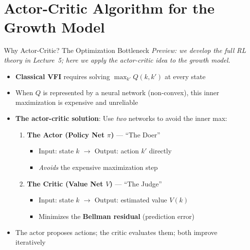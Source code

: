 \documentclass[10pt,english,aspectratio=169]{beamer}
\begin{document}
\section{Actor-Critic Algorithm for the Growth Model}

\begin{frame}{Why Actor-Critic? The Optimization Bottleneck}
\emph{Preview: we develop the full RL theory in Lecture~5; here we apply the actor-critic idea to the growth model.}
\medskip
\begin{itemize}
  \item \textbf{Classical VFI} requires solving $\max_{k'} Q(k, k')$ at every state
  \item When $Q$ is represented by a neural network (non-convex), this inner maximization is expensive and unreliable
  \medskip
  \item \textbf{The actor-critic solution}: Use \emph{two} networks to avoid the inner max:
    \begin{enumerate}
      \item \textbf{The Actor (Policy Net $\pi$)} --- ``The Doer''
        \begin{itemize}
          \item Input: state $k$ $\to$ Output: action $k'$ directly
          \item \emph{Avoids} the expensive maximization step
        \end{itemize}
      \item \textbf{The Critic (Value Net $V$)} --- ``The Judge''
        \begin{itemize}
          \item Input: state $k$ $\to$ Output: estimated value $V(k)$
          \item Minimizes the \textbf{Bellman residual} (prediction error)
        \end{itemize}
    \end{enumerate}
  \medskip
  \item The actor proposes actions; the critic evaluates them; both improve iteratively
\end{itemize}
\end{frame}
\end{document}
